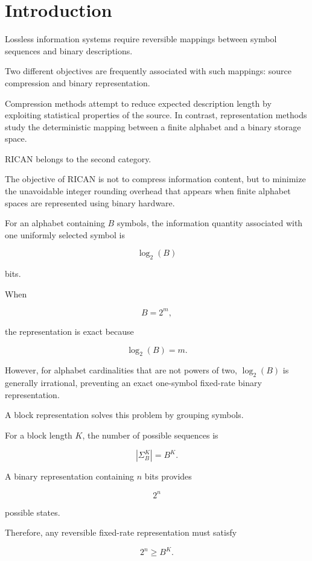 \documentclass[onecolumn]{IEEEtran}
\begin{document}

\section{Introduction}

Lossless information systems require reversible mappings between
symbol sequences and binary descriptions.

Two different objectives are frequently associated with such mappings:
source compression and binary representation.

Compression methods attempt to reduce expected description length by
exploiting statistical properties of the source. In contrast,
representation methods study the deterministic mapping between a finite
alphabet and a binary storage space.

RICAN belongs to the second category.

The objective of RICAN is not to compress information content, but to
minimize the unavoidable integer rounding overhead that appears when
finite alphabet spaces are represented using binary hardware.

For an alphabet containing $B$ symbols, the information quantity
associated with one uniformly selected symbol is

\[
\log_2(B)
\]

bits.

When

\[
B=2^m ,
\]

the representation is exact because

\[
\log_2(B)=m .
\]

However, for alphabet cardinalities that are not powers of two,
$\log_2(B)$ is generally irrational, preventing an exact
one-symbol fixed-rate binary representation.

A block representation solves this problem by grouping symbols.

For a block length $K$, the number of possible sequences is

\[
|\Sigma_B^K|=B^K .
\]

A binary representation containing $n$ bits provides

\[
2^n
\]

possible states.

Therefore, any reversible fixed-rate representation must satisfy

\[
2^n\geq B^K .
\]
\end{document}
